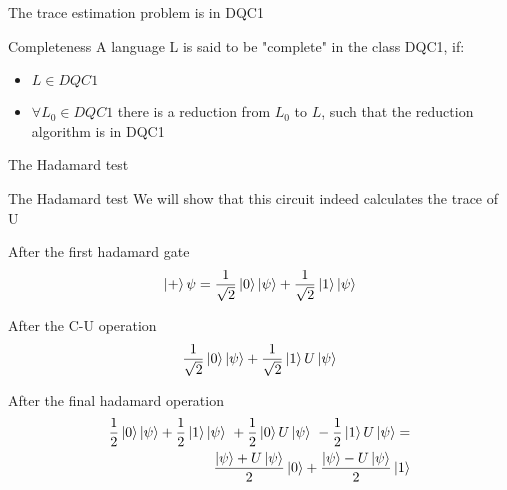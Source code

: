 \documentclass[leqno,fleqn]{beamer}
\begin{document}
\begin{frame}[label=sec-1-7]{The trace estimation problem is in DQC1}
\begin{block}{Completeness}
A language L is said to be "complete" in the class DQC1, if:
\begin{itemize}
\item \(L \in DQC1\)
\item \(\forall L_{0} \in DQC1\) there is a reduction from \(L_{0}\) to \(L\), such that the reduction algorithm is in DQC1
\end{itemize}
\end{block}
\end{frame}
\begin{frame}[label=sec-1-8]{The Hadamard test}
\end{frame}

\begin{frame}[label=sec-1-9]{The Hadamard test}
We will show that this circuit indeed calculates the trace of U
\begin{block}{After the first hadamard gate}
\begin{align*}
   \Ket{+}\psi = \frac{1}{\sqrt{2}}\Ket{0}\Ket{\psi} + \frac{1}{\sqrt{2}}\Ket{1}\Ket{\psi}
\end{align*}
\end{block}
\begin{block}{After the C-U operation}
\begin{align*}
   \frac{1}{\sqrt{2}}\Ket{0}\Ket{\psi} + \frac{1}{\sqrt{2}}\Ket{1}U\Ket{\psi}
\end{align*}
\end{block}
\begin{block}{After the final hadamard operation}
\begin{align*}
   \frac{1}{2}\Ket{0}\Ket{\psi} + \frac{1}{2}\Ket{1}\Ket{\psi}\ +\frac{1}{2}\Ket{0}U\Ket{\psi}\ -  \frac{1}{2}\Ket{1}U\Ket{\psi} = \\
   \frac{\Ket{\psi} + U\Ket{\psi}}{2}\Ket{0} + \frac{\Ket{\psi} - U\Ket{\psi}}{2}\Ket{1}
\end{align*}
\end{block}
\end{frame}
\end{document}
